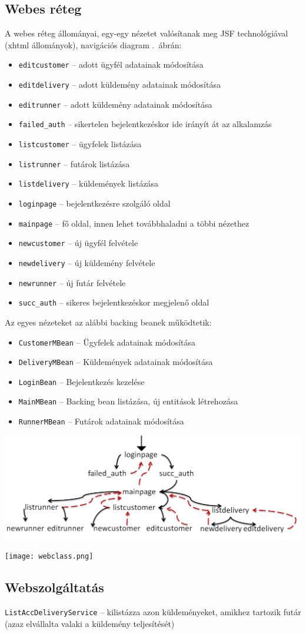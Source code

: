 \documentclass[a4paper,oneside,12pt]{article}
\begin{document}
\subsection{Webes réteg}
A webes réteg állományai, egy-egy nézetet valósítanak meg JSF technológiával
(xhtml állományok), navigációs diagram .~ábrán: 
\begin{itemize}
\item \verb+editcustomer+ -- adott ügyfél adatainak módosítása
\item \verb+editdelivery+ -- adott küldemény adatainak módosítása
\item \verb+editrunner+ -- adott küldemény adatainak módosítása
\item \verb+failed_auth+ -- sikertelen bejelentkezéskor ide irányít át az alkalamzás
\item \verb+listcustomer+ -- ügyfelek listázása
\item \verb+listrunner+ -- futárok listázása
\item \verb+listdelivery+ -- küldemények listázása
\item \verb+loginpage+ -- bejelentkezésre szolgáló oldal
\item \verb+mainpage+ -- fő oldal, innen lehet továbbhaladni a többi nézethez
\item \verb+newcustomer+ -- új ügyfél felvétele
\item \verb+newdelivery+ -- új küldemény felvétele
\item \verb+newrunner+ -- új futár felvétele
\item \verb+succ_auth+ -- sikeres bejelentkezéskor megjelenő oldal
\end{itemize}
%
Az egyes nézeteket az alábbi backing beanek működtetik:
\begin{itemize}
\item \verb+CustomerMBean+ -- Ügyfelek adatainak módosítása
\item \verb+DeliveryMBean+ -- Küldemények adatainak módosítása
\item \verb+LoginBean+ -- Bejelentkezés kezelése 
\item \verb+MainMBean+  -- Backing bean listázása, új entitások létrehozása
\item \verb+RunnerMBean+ -- Futárok adatainak módosítása
\end{itemize}
\begin{center}
        \includegraphics[width=14cm]{nav_diag.png}
        \label{fig:nav-diag}
\end{center}
\begin{center}
        \texttt{[image: webclass.png]}
        \label{fig:webclass}
\end{center}
\subsection{Webszolgáltatás }
\verb+ListAccDeliveryService+ -- kilistázza azon küldeményeket, amikhez tartozik futár
(azaz elvállalta valaki a küldemény teljesítését)
\end{document}
